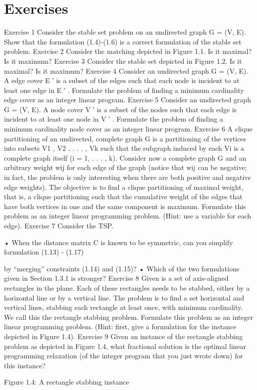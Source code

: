 \documentclass[titlepage]{book}
\begin{document}
\section*{Exercises}
Exercise 1
Consider the stable set problem on an undirected graph G = (V, E). Show that the formulation (1.4)-(1.6)
is a correct formulation of the stable set problem.
Exercise 2
Consider the matching depicted in Figure 1.1. Is it maximal? Is it maximum?
Exercise 3
Consider the stable set depicted in Figure 1.2. Is it maximal? Is it maximum?
Exercise 4
Consider an undirected graph G = (V, E). A edge cover E ′ is a subset of the edges such that each node is
incident to at least one edge in E ′ . Formulate the problem of finding a minimum cardinality edge cover
as an integer linear program.
Exercise 5
Consider an undirected graph G = (V, E). A node cover V ′ is a subset of the nodes such that each edge
is incident to at least one node in V ′ . Formulate the problem of finding a minimum cardinality node
cover as an integer linear program.
Exercise 6
A clique partitioning of an undirected, complete graph G is a partitioning of the vertices into subsets
V1 , V2 , . . . , Vk such that the subgraph induced by each Vi is a complete graph itself (i = 1, . . . , k). Consider
now a complete graph G and an arbitrary weight wij for each edge of the graph (notice that wij can be
negative; in fact, the problem is only interesting when there are both positive and negative edge weights).
The objective is to find a clique partitioning of maximal weight, that is, a clique partitioning such that
the cumulative weight of the edges that have both vertices in one and the same component is maximum.
Formulate this problem as an integer linear programming problem. (Hint: use a variable for each edge).
Exercise 7
Consider the TSP.

• When the distance matrix C is known to be symmetric, can you simplify formulation (1.13) - (1.17)

by “merging” constraints (1.14) and (1.15)?
• Which of the two formulations given in Section 1.3.1 is stronger?
Exercise 8
Given is a set of axis-aligned rectangles in the plane. Each of these rectangles needs to be stabbed, either
by a horizontal line or by a vertical line. The problem is to find a set horizontal and vertical lines, stabbing
each rectangle at least once, with minimum cardinality. We call this the rectangle stabbing problem.
Formulate this problem as an integer linear programming problem. (Hint: first, give a formulation for
the instance depicted in Figure 1.4).
Exercise 9
Given an instance of the rectangle stabbing problem as depicted in Figure 1.4, what fractional solution
is the optimal linear programming relaxation (of the integer program that you just wrote down) for this
instance?

Figure 1.4: A rectangle stabbing instance
\end{document}
